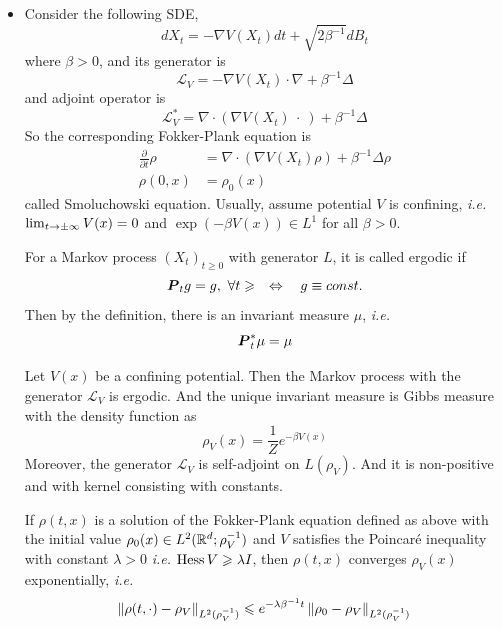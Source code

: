 \documentclass[a4paper,12pt]{article}
\begin{document}
\begin{itemize}
  \item Consider the following SDE,
  \begin{equation*}
    dX_t = - \nabla V(X_t)dt + \sqrt{2\beta^{-1}}dB_t
  \end{equation*}
  where $\beta > 0$, and its generator is
  \begin{equation*}
    \mathcal{L}_V = - \nabla V(X_t) \cdot \nabla + \beta^{-1}\Delta
  \end{equation*}
  and adjoint operator is
  \begin{equation*}
    \mathcal{L}_V^* = \nabla\cdot(\nabla V(X_t) ~\cdot~) + \beta^{-1}\Delta
  \end{equation*}
  So the corresponding Fokker-Plank equation is
  \begin{equation*}
    \begin{split}
      \frac{\partial}{\partial t} \rho &= \nabla\cdot(\nabla V(X_t) \rho) + \beta^{-1}\Delta \rho\\
      \rho(0,x) &= \rho_0(x)
    \end{split}
  \end{equation*}
  called Smoluchowski equation. Usually, assume potential $V$ is confining, \emph{i.e.} $\lim_{t \rightarrow \pm\infty}V(x) = 0$ and $\exp(-\beta V(x)) \in L^1$ for all $\beta > 0$.

  \noindent For a Markov process $(X_t)_{t \geqslant 0}$ with generator $L$, it is called ergodic if 
  \begin{equation*}
    \boldsymbol{P}_tg = g, ~\forall t \geqslant \quad \Leftrightarrow \quad g\equiv const.
  \end{equation*}
  Then by the definition, there is an invariant measure $\mu$, \emph{i.e.}
  \begin{equation*}
    \boldsymbol{P}_t^*\mu = \mu
  \end{equation*}

  \begin{prop}
    Let $V(x)$ be a confining potential. Then the Markov process with the generator $\mathcal{L}_V$ is ergodic. And the unique invariant measure is Gibbs measure with the density function as
    \begin{equation*}
      \rho_V(x) = \frac{1}{Z}e^{-\beta V(x)}
    \end{equation*}
    Moreover, the generator $\mathcal{L}_V$ is self-adjoint on $L(\rho_V)$. And it is non-positive and with kernel consisting with constants.
  \end{prop}

  \begin{prop}
    If $\rho(t,x)$ is a solution of the Fokker-Plank equation defined as above with the initial value $\rho_0(x) \in L^2(\mathbb{R}^d;\rho_V^{-1})$ and $V$ satisfies the Poincar\'e inequality with constant $\lambda > 0$ \emph{i.e.} $\operatorname{Hess} V \geqslant \lambda I$, then $\rho(t,x)$ converges $\rho_V(x)$ exponentially, \emph{i.e.}
    \begin{equation*}
      \left\lVert\rho(t,\cdot)-\rho_V\right\lVert_{L^2(\rho_V^{-1})} \leqslant e^{-\lambda \beta^{-1}t}\left\lVert\rho_0-\rho_V\right\lVert_{L^2(\rho_V^{-1})}
    \end{equation*}
  \end{prop}

\end{itemize}
\end{document}

